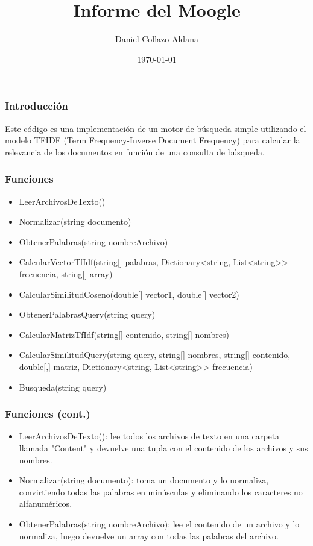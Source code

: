 \documentclass{beamer}
\title{Informe del Moogle}
\author{Daniel Collazo Aldana}
\institute{Grupo C112}
\date{\today}
\begin{document}
\begin{frame}
\titlepage
\end{frame}

\begin{frame}
\frametitle{Introducción}
Este código es una implementación de un motor de búsqueda simple utilizando el modelo TFIDF (Term Frequency-Inverse Document Frequency) para calcular la relevancia de los documentos en función de una consulta de búsqueda.
\end{frame}

\begin{frame}
\frametitle{Funciones}
\begin{itemize}
\item LeerArchivosDeTexto()
\item Normalizar(string documento)
\item ObtenerPalabras(string nombreArchivo)
\item CalcularVectorTfIdf(string[] palabras, Dictionary<string, List<string>> frecuencia, string[] array)
\item CalcularSimilitudCoseno(double[] vector1, double[] vector2)
\item ObtenerPalabrasQuery(string query)
\item CalcularMatrizTfIdf(string[] contenido, string[] nombres)
\item CalcularSimilitudQuery(string query, string[] nombres, string[] contenido, double[,] matriz, Dictionary<string, List<string>> frecuencia)
\item Busqueda(string query)
\end{itemize}
\end{frame}

\begin{frame}
\frametitle{Funciones (cont.)}
\begin{itemize}
\item LeerArchivosDeTexto(): lee todos los archivos de texto en una carpeta llamada "Content" y devuelve una tupla con el contenido de los archivos y sus nombres.
\item Normalizar(string documento): toma un documento y lo normaliza, convirtiendo todas las palabras en minúsculas y eliminando los caracteres no alfanuméricos.
\item ObtenerPalabras(string nombreArchivo): lee el contenido de un archivo y lo normaliza, luego devuelve un array con todas las palabras del archivo.
\end{itemize}
\end{frame}
\end{document}
